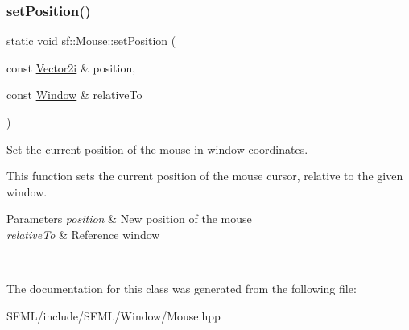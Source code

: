 \subsubsection{\texorpdfstring{setPosition()}{setPosition()}\hspace{0.1cm}{\footnotesize\ttfamily [2/2]}}
{\footnotesize\ttfamily static void sf\+::\+Mouse\+::set\+Position (\begin{DoxyParamCaption}\item[{const \mbox{\hyperlink{classsf_1_1_vector2}{Vector2i}} \&}]{position,  }\item[{const \mbox{\hyperlink{classsf_1_1_window}{Window}} \&}]{relative\+To }\end{DoxyParamCaption})\hspace{0.3cm}{\ttfamily [static]}}



Set the current position of the mouse in window coordinates. 

This function sets the current position of the mouse cursor, relative to the given window.


\begin{DoxyParams}{Parameters}
{\em position} & New position of the mouse \\
\hline
{\em relative\+To} & Reference window \begin{DoxyVerb}\end{DoxyVerb}
 \\
\hline
\end{DoxyParams}


The documentation for this class was generated from the following file\+:\begin{DoxyCompactItemize}
\item 
S\+F\+M\+L/include/\+S\+F\+M\+L/\+Window/Mouse.\+hpp\end{DoxyCompactItemize}
